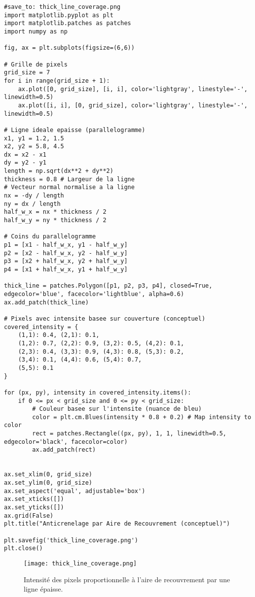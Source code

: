 \documentclass{article}
\begin{document}
\begin{verbatim}
#save_to: thick_line_coverage.png
import matplotlib.pyplot as plt
import matplotlib.patches as patches
import numpy as np

fig, ax = plt.subplots(figsize=(6,6))

# Grille de pixels
grid_size = 7
for i in range(grid_size + 1):
    ax.plot([0, grid_size], [i, i], color='lightgray', linestyle='-', linewidth=0.5)
    ax.plot([i, i], [0, grid_size], color='lightgray', linestyle='-', linewidth=0.5)

# Ligne ideale epaisse (parallelogramme)
x1, y1 = 1.2, 1.5
x2, y2 = 5.8, 4.5
dx = x2 - x1
dy = y2 - y1
length = np.sqrt(dx**2 + dy**2)
thickness = 0.8 # Largeur de la ligne
# Vecteur normal normalise a la ligne
nx = -dy / length
ny = dx / length
half_w_x = nx * thickness / 2
half_w_y = ny * thickness / 2

# Coins du parallelogramme
p1 = [x1 - half_w_x, y1 - half_w_y]
p2 = [x2 - half_w_x, y2 - half_w_y]
p3 = [x2 + half_w_x, y2 + half_w_y]
p4 = [x1 + half_w_x, y1 + half_w_y]

thick_line = patches.Polygon([p1, p2, p3, p4], closed=True, edgecolor='blue', facecolor='lightblue', alpha=0.6)
ax.add_patch(thick_line)

# Pixels avec intensite basee sur couverture (conceptuel)
covered_intensity = {
    (1,1): 0.4, (2,1): 0.1,
    (1,2): 0.7, (2,2): 0.9, (3,2): 0.5, (4,2): 0.1,
    (2,3): 0.4, (3,3): 0.9, (4,3): 0.8, (5,3): 0.2,
    (3,4): 0.1, (4,4): 0.6, (5,4): 0.7,
    (5,5): 0.1
}

for (px, py), intensity in covered_intensity.items():
    if 0 <= px < grid_size and 0 <= py < grid_size:
        # Couleur basee sur l'intensite (nuance de bleu)
        color = plt.cm.Blues(intensity * 0.8 + 0.2) # Map intensity to color
        rect = patches.Rectangle((px, py), 1, 1, linewidth=0.5, edgecolor='black', facecolor=color)
        ax.add_patch(rect)


ax.set_xlim(0, grid_size)
ax.set_ylim(0, grid_size)
ax.set_aspect('equal', adjustable='box')
ax.set_xticks([])
ax.set_yticks([])
ax.grid(False)
plt.title("Anticrenelage par Aire de Recouvrement (conceptuel)")

plt.savefig('thick_line_coverage.png')
plt.close()
\end{verbatim}

\begin{figure}[H]
\centering
\texttt{[image: thick\_line\_coverage.png]}
\caption{Intensité des pixels proportionnelle à l'aire de recouvrement par une ligne épaisse.}
\label{fig:thick_line_coverage}
\end{figure}
\end{document}
